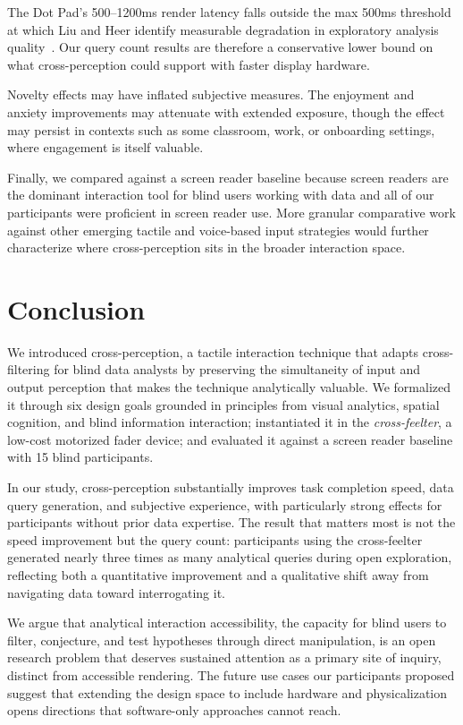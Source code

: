 \documentclass[12pt]{cmuthesis}
\begin{document}
The Dot Pad's 500--1200ms render latency falls outside the max 500ms threshold at which Liu and Heer identify measurable degradation in exploratory analysis quality~\cite{Liu2014}. Our query count results are therefore a conservative lower bound on what cross-perception could support with faster display hardware. 

Novelty effects may have inflated subjective measures. The enjoyment and anxiety improvements may attenuate with extended exposure, though the effect may persist in contexts such as some classroom, work, or onboarding settings, where engagement is itself valuable. 

Finally, we compared against a screen reader baseline because screen readers are the dominant interaction tool for blind users working with data and all of our participants were proficient in screen reader use. More granular comparative work against other emerging tactile and voice-based input strategies would further characterize where cross-perception sits in the broader interaction space.

\section{Conclusion}
\label{sec:conclusion} 

We introduced cross-perception, a tactile interaction technique that adapts cross-filtering for blind data analysts by preserving the simultaneity of input and output perception that makes the technique analytically valuable. We formalized it through six design goals grounded in principles from visual analytics, spatial cognition, and blind information interaction; instantiated it in the \textit{cross-feelter}, a low-cost motorized fader device; and evaluated it against a screen reader baseline with 15 blind participants. 

In our study, cross-perception substantially improves task completion speed, data query generation, and subjective experience, with particularly strong effects for participants without prior data expertise. The result that matters most is not the speed improvement but the query count: participants using the cross-feelter generated nearly three times as many analytical queries during open exploration, reflecting both a quantitative improvement and a qualitative shift away from navigating data toward interrogating it. 

We argue that analytical interaction accessibility, the capacity for blind users to filter, conjecture, and test hypotheses through direct manipulation, is an open research problem that deserves sustained attention as a primary site of inquiry, distinct from accessible rendering. The future use cases our participants proposed suggest that extending the design space to include hardware and physicalization opens directions that software-only approaches cannot reach.
\end{document}

